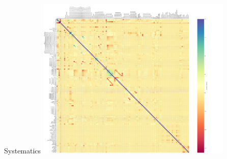 \begin{frame}{Systematics}
    \centering
    \includegraphics[width=0.7\textwidth]{chapters/Analysis/sectionSystematics/figures/correlation_matrix_full.pdf}
\end{frame}

\begin{frame}{}
    \centering
    \begin{table}[]
        \renewcommand{\arraystretch}{1.1}
        \setlength{\tabcolsep}{0.4em}
        \centering
        \resizebox{0.6\textwidth}{!}{}
    \end{table}
\end{frame}



